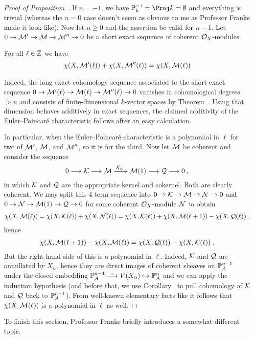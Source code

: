 \documentclass[a4paper,parskip=half,numbers=enddot, DIV=12]{scrreprt}
\renewcommand{\geq}{\geqslant}
\begin{document}
\begin{proof}[Proof of Proposition~]
	If $n=-1$, we have $\IP_k^{-1}=\Proj k=\emptyset$ and everything is trivial (whereas the $n=0$ case doesn't seem as obvious to me as Professor Franke made it look like). Now let $n\geq 0$ and the assertion be valid for $n-1$. Let $0\morphism \Mm'\morphism\Mm\morphism\Mm''\morphism 0$ be a short exact sequence of coherent $\mathcal{O}_X$-modules. 
	\begin{claim}
		For all $\ell\in \mathbb{Z}$ we have
		\begin{align*}
			\chi(X,\mathcal{M}'(\ell))+\chi(X,\mathcal{M}''(\ell))=\chi(X,\mathcal{M}(\ell))
		\end{align*}
	\end{claim}
	Indeed, the long exact cohomology sequence associated to the short exact sequence $0\morphism \Mm'(\ell)\morphism\Mm(\ell)\morphism\Mm''(\ell)\morphism 0$ vanishes in cohomological degrees $>n$ and consists of finite-dimensional $k$-vector spaces by Theorem~. Using that dimension behaves additively in exact sequences, the claimed additivity of the Euler--Poincaré characteristic follows after an easy calculation.
	
	In particular, when the Euler--Poincaré characteristic is a polynomial in $\ell$ for two of $\mathcal{M}'$, $\mathcal{M}$, and $\mathcal{M}''$, so it is for the third. Now let $\mathcal{M}$ be coherent and consider the sequence
	\begin{align*}
		0\morphism \Kk\morphism \Mm\xrightarrow{X_n\cdot }\Mm(1)\morphism \Qq\morphism 0\;,
	\end{align*}
	in which $\mathcal{K}$ and $\mathcal{Q}$ are the appropriate kernel and cokernel. Both are clearly coherent. We may split this 4-term sequence into $0\morphism \Kk\morphism \Mm\morphism \Nn\morphism 0$ and $0\morphism\Nn\morphism\Mm(1)\morphism \Qq\morphism 0$ for some coherent $\mathcal{O}_X$-module $\mathcal{N}$ to obtain
	\begin{align*}
		\chi(X,\mathcal{M}(\ell))=\chi(X,\mathcal{K}(\ell))+\chi(X,\mathcal{N}(\ell))=\chi(X,\mathcal{K}(\ell))+\chi(X,\mathcal{M}(\ell+1))-\chi(X,\mathcal{Q}(\ell))\;,
	\end{align*}
	hence
	\begin{align*}
		\chi(X,\mathcal{M}(\ell+1))-\chi(X,\mathcal{M}(\ell))=\chi(X,\mathcal{Q}(\ell))-\chi(X,\mathcal{K}(\ell))\;.
	\end{align*}
	But the right-hand side of this is a polynomial in $\ell$. Indeed, $\mathcal{K}$ and $\mathcal{Q}$ are annullated by $X_n$, hence they are direct images of coherent sheaves on $\mathbb{P}_A^{n-1}$ under the closed embedding $\IP_A^{n-1}\isomorphism V(X_n)\monomorphism \IP_A^n$ and we can apply the induction hypothesis (and before that, we use Corollary~ to pull cohomology of $\mathcal{K}$ and $\mathcal{Q}$ back to $\mathbb{P}_A^{n-1}$). From well-known elementary facts like \cite[Fact~3.1.1]{alg2} it follows that $\chi(X,\mathcal{M}(\ell))$ is a polynomial in $\ell$ as well.
\end{proof}
To finish this section, Professor Franke briefly introduces a somewhat different topic.
\end{document}
